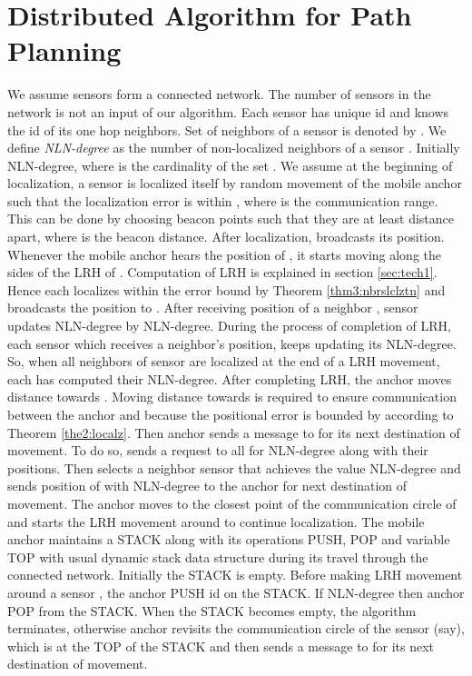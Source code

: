 \documentclass[preprint,11pt]{elsarticle}
\begin{document}
\section{Distributed Algorithm for Path Planning}
\label{sec:algomodel}
We assume sensors form a connected network. The number of sensors in the network is not an input of our algorithm.
Each sensor has unique id and knows the id of its one hop neighbors. Set of neighbors of a sensor  is denoted by .
We define {\it NLN-degree} as the number of non-localized neighbors of a sensor . Initially NLN-degree, where
 is the cardinality of the set . We assume at the beginning of localization, a sensor  is localized itself by
random movement of the mobile anchor such that the localization error is within , where  is the communication range. This can be done by choosing beacon points such that they are at least  distance apart, where  is the beacon distance. After localization, 
broadcasts its position.
Whenever the mobile anchor hears the position of , it starts moving along the sides of the LRH of . Computation of LRH is explained in section \ref{sec:tech1}. Hence each  localizes within the error bound  by Theorem \ref{thm3:nbrslclztn} and broadcasts the position to . After receiving position of a neighbor , sensor  updates NLN-degree by NLN-degree. During the process of completion of LRH, each sensor which receives a neighbor's position, keeps updating its NLN-degree. So, when all neighbors of sensor  are localized at the end of a LRH movement, each  has computed their NLN-degree. After completing LRH, the anchor moves  distance towards . Moving  distance towards  is required to ensure communication between the anchor and  because the positional error is bounded by  according to Theorem \ref{the2:localz}. Then anchor sends a message to  for its next destination of movement.
To do so,  sends a request to all  for NLN-degree along with their positions. Then  selects
a neighbor sensor  that achieves the value NLN-degree and sends position of  with NLN-degree to the anchor for next destination of movement. The anchor moves to the closest point of the communication circle of  and starts the LRH movement around  to continue localization. The mobile anchor maintains a STACK along with its operations PUSH, POP and variable TOP with usual dynamic stack data structure during its travel through the connected network.
Initially the STACK is empty. Before making LRH movement around a sensor , the anchor PUSH id  on the STACK. If NLN-degree then anchor POP  from the STACK. When the STACK becomes empty, the algorithm terminates, otherwise anchor revisits the communication circle of the sensor  (say), which is at the TOP of the STACK and then sends a message to  for its next destination of movement.
\end{document}
